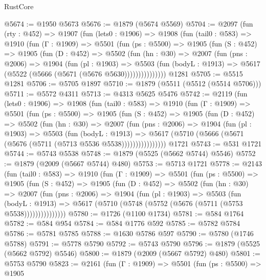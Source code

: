 \begin{lexlean}{RustCore}
\begin{coremodule}
@5674 := @1950 @5673
@5676 := @1879 (@5674 @5569)
@5704 := @2097
    (fun (rty : @452) =>
    @1907
      (fun (lets0 : @1906) =>
      @1908
        (fun (tail0 : @583) =>
        @1910
          (fun (Γ : @1909) =>
          @5501
            (fun (ps : @5500) =>
            @1905
              (fun (S : @452) =>
              @1905
                (fun (D : @452) =>
                @5502
                  (fun (hn : @30) =>
                  @2007
                    (fun (pns : @2006) =>
                    @1904
                      (fun (pl : @1903) =>
                      @5503
                        (fun (bodyL : @1913) =>
                        @5617 (@5522 (@5666 (@5671 (@5676 @5630)))))))))))))))
    @1281
@5705 := @5515 @1281
@5706 := @5705 @1897
@5710 := @1879 (@5511 (@5512 (@5514 @5706)))
@5711 := @5572 @4311
@5713 := @4313 @5625 @5476
@5742 := @2119
    (fun (lets0 : @1906) =>
    @1908
      (fun (tail0 : @583) =>
      @1910
        (fun (Γ : @1909) =>
        @5501
          (fun (ps : @5500) =>
          @1905
            (fun (S : @452) =>
            @1905
              (fun (D : @452) =>
              @5502
                (fun (hn : @30) =>
                @2007
                  (fun (pns : @2006) =>
                  @1904
                    (fun (pl : @1903) =>
                    @5503
                      (fun (bodyL : @1913) =>
                      @5617 (@5710 (@5666 (@5671 (@5676 (@5711 (@5713 @5536 @5538))))))))))))))))
    @1721
@5743 := @531 @1721
@5744 := @5743 @5538
@5748 := @1879 (@5525 (@5662 @5744) @5546)
@5752 := @1879 (@2009 (@5667 @5744) @480)
@5753 := @5713 @1721
@5778 := @2143
    (fun (tail0 : @583) =>
    @1910
      (fun (Γ : @1909) =>
      @5501
        (fun (ps : @5500) =>
        @1905
          (fun (S : @452) =>
          @1905
            (fun (D : @452) =>
            @5502
              (fun (hn : @30) =>
              @2007
                (fun (pns : @2006) =>
                @1904
                  (fun (pl : @1903) =>
                  @5503
                    (fun (bodyL : @1913) =>
                    @5617 (@5710 (@5748 (@5752 (@5676 (@5711 (@5753 @5538)))))))))))))))
@5780 := @1726 (@1100 @1734)
@5781 := @584 @1764
@5782 := @584 @954
@5784 := @584 @1776 @592
@5785 := @5782 @5784
@5786 := @5781 @5785
@5788 := @1630 @5786 @597
@5790 := @5780 (@1746 @5788)
@5791 := @5778 @5790
@5792 := @5743 @5790
@5796 := @1879 (@5525 (@5662 @5792) @5546)
@5800 := @1879 (@2009 (@5667 @5792) @480)
@5801 := @5753 @5790
@5823 := @2161
    (fun (Γ : @1909) =>
    @5501
      (fun (ps : @5500) =>
      @1905

\end{coremodule}
\end{lexlean}
